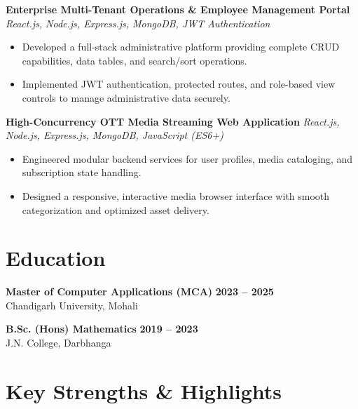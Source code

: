 \documentclass[a4paper,10pt]{article}
\begin{document}
\textbf{Enterprise Multi-Tenant Operations & Employee Management Portal}
\hfill
\textit{React.js, Node.js, Express.js, MongoDB, JWT Authentication}

\begin{itemize}

    \item Developed a full-stack administrative platform providing complete CRUD capabilities, data tables, and search/sort operations.

    \item Implemented JWT authentication, protected routes, and role-based view controls to manage administrative data securely.

\end{itemize}


\textbf{High-Concurrency OTT Media Streaming Web Application}
\hfill
\textit{React.js, Node.js, Express.js, MongoDB, JavaScript (ES6+)}

\begin{itemize}

    \item Engineered modular backend services for user profiles, media cataloging, and subscription state handling.

    \item Designed a responsive, interactive media browser interface with smooth categorization and optimized asset delivery.

\end{itemize}

\section*{Education}

\textbf{Master of Computer Applications (MCA)}
\hfill
\textbf{2023 -- 2025}
\\
Chandigarh University, Mohali

\vspace{3pt}

\textbf{B.Sc. (Hons) Mathematics}
\hfill
\textbf{2019 -- 2023}
\\
J.N. College, Darbhanga

\section*{Key Strengths \& Highlights}
\end{document}
